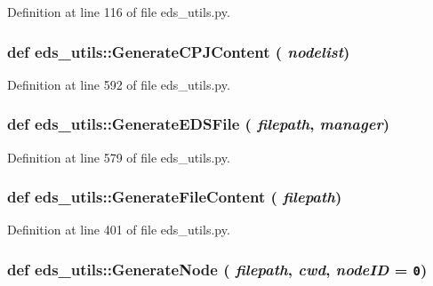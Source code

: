 Definition at line 116 of file eds\_\-utils.py.\hypertarget{namespaceeds__utils_6ec7fa0870074fd7e67037cd1dd55e6f}{
\subsubsection[GenerateCPJContent]{\setlength{\rightskip}{0pt plus 5cm}def eds\_\-utils::Generate\-CPJContent ( {\em nodelist})}}
\label{namespaceeds__utils_6ec7fa0870074fd7e67037cd1dd55e6f}




Definition at line 592 of file eds\_\-utils.py.\hypertarget{namespaceeds__utils_0c22661f0eadca172b3ee5eda06401c3}{
\subsubsection[GenerateEDSFile]{\setlength{\rightskip}{0pt plus 5cm}def eds\_\-utils::Generate\-EDSFile ( {\em filepath},  {\em manager})}}
\label{namespaceeds__utils_0c22661f0eadca172b3ee5eda06401c3}




Definition at line 579 of file eds\_\-utils.py.\hypertarget{namespaceeds__utils_535cc0359a4d2f59718b381b40915ebe}{
\subsubsection[GenerateFileContent]{\setlength{\rightskip}{0pt plus 5cm}def eds\_\-utils::Generate\-File\-Content ( {\em filepath})}}
\label{namespaceeds__utils_535cc0359a4d2f59718b381b40915ebe}




Definition at line 401 of file eds\_\-utils.py.\hypertarget{namespaceeds__utils_1d636df1ab11a25fa4ab4b479fd05e5e}{
\subsubsection[GenerateNode]{\setlength{\rightskip}{0pt plus 5cm}def eds\_\-utils::Generate\-Node ( {\em filepath},  {\em cwd},  {\em node\-ID} = {\tt 0})}}
\label{namespaceeds__utils_1d636df1ab11a25fa4ab4b479fd05e5e}




